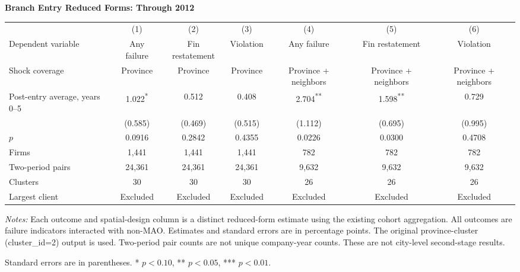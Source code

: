 \documentclass[10pt]{article}
\newcommand{\sym}[1]{\textsuperscript{#1}}
\begin{document}
\begin{minipage}{23.60cm}
\fontsize{10}{12}\selectfont
\setlength{\tabcolsep}{4pt}\renewcommand{\arraystretch}{1.08}
{\large\bfseries Branch Entry Reduced Forms: Through 2012}\par\medskip
\begin{tabular*}{\linewidth}{@{\extracolsep{\fill}}lcccccc@{}}
\toprule
 & (1) & (2) & (3) & (4) & (5) & (6) \\
Dependent variable & Any failure & Fin restatement & Violation & Any failure & Fin restatement & Violation \\
Shock coverage & Province & Province & Province & Province + neighbors & Province + neighbors & Province + neighbors \\
\midrule
Post-entry average, years 0--5 & 1.022\sym{*} & 0.512 & 0.408 & 2.704\sym{**} & 1.598\sym{**} & 0.729 \\
 & (0.585) & (0.469) & (0.515) & (1.112) & (0.695) & (0.995) \\
$p$ & 0.0916 & 0.2842 & 0.4355 & 0.0226 & 0.0300 & 0.4708 \\
\midrule
Firms & 1,441 & 1,441 & 1,441 & 782 & 782 & 782 \\
Two-period pairs & 24,361 & 24,361 & 24,361 & 9,632 & 9,632 & 9,632 \\
Clusters & 30 & 30 & 30 & 26 & 26 & 26 \\
Largest client & Excluded & Excluded & Excluded & Excluded & Excluded & Excluded \\
\bottomrule\end{tabular*}\par\medskip
\fontsize{9}{11}\selectfont\textit{Notes:} Each outcome and spatial-design column is a distinct reduced-form estimate using the existing cohort aggregation. All outcomes are failure indicators interacted with non-MAO. Estimates and standard errors are in percentage points. The original province-cluster (cluster\_id=2) output is used. Two-period pair counts are not unique company-year counts. These are not city-level second-stage results.
\par Standard errors are in parentheses. * $p<0.10$, ** $p<0.05$, *** $p<0.01$.
\end{minipage}
\end{document}
